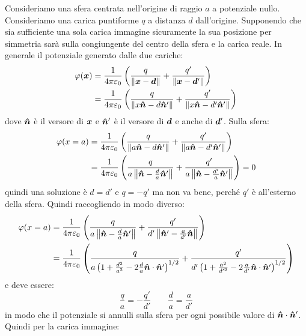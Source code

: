 \begin{Es}
  Consideriamo una sfera centrata nell'origine di raggio $a$ a potenziale nullo. Consideriamo una carica puntiforme $q$ a distanza $d$ dall'origine. Supponendo che sia sufficiente una sola carica immagine sicuramente la sua posizione per simmetria sarà sulla congiungente del centro della sfera e la carica reale. In generale il potenziale generato dalle due cariche:
  \begin{equation*}
    \begin{aligned}
      \varphi(\boldsymbol{x}) & = \frac{1}{4\pi\varepsilon_0}\left(\frac{q}{\left\lVert\boldsymbol{x} -\boldsymbol{d}\right\rVert}+\frac{q'}{\left\lVert\boldsymbol{x}-\boldsymbol{d}'\right\rVert}\right)           \\
                     & = \frac{1}{4\pi\varepsilon_0}\left(\frac{q}{\left\lVert x\boldsymbol{\hat {n}} -d\boldsymbol{\hat {n}}'\right\rVert}+\frac{q'}{\left\lVert x\boldsymbol{\hat {n}}-d'\boldsymbol{\hat {n}}'\right\rVert}\right)
    \end{aligned}
  \end{equation*}
  dove $\boldsymbol{\hat {n}}$ è il versore di $\boldsymbol{x}$ e $\boldsymbol{\hat {n}}'$ è il versore di $\boldsymbol{d}$ e anche di $\boldsymbol{d}'$. Sulla sfera:
  \begin{equation*}
    \begin{aligned}
      \varphi(x=a) & = \frac{1}{4\pi\varepsilon_0}\left(\frac{q}{\left\lVert a\boldsymbol{\hat {n}} -d\boldsymbol{\hat {n}}'\right\rVert}+\frac{q'}{\left\lVert a\boldsymbol{\hat {n}}-d'\boldsymbol{\hat {n}}'\right\rVert}\right)                       \\
                   & = \frac{1}{4\pi\varepsilon_0}\left(\frac{q}{a\left\lVert\boldsymbol{\hat {n}} -\frac{d}{a}\boldsymbol{\hat {n}}'\right\rVert}+\frac{q'}{a\left\lVert\boldsymbol{\hat {n}}-\frac{d'}{a}\boldsymbol{\hat {n}}'\right\rVert}\right)=0
    \end{aligned}
  \end{equation*}
  quindi una soluzione è $d=d'$ e $q=-q'$ ma non va bene, perché $q'$ è all'esterno della sfera. Quindi raccogliendo in modo diverso:
  \begin{equation*}
    \begin{aligned}
      \varphi(x=a) & = \frac{1}{4\pi\varepsilon_0}\left(\frac{q}{a\left\lVert\boldsymbol{\hat {n}}-\frac{d}{a}\boldsymbol{\hat {n}}'\right\rVert}+\frac{q'}{d'\left\lVert\boldsymbol{\hat {n}}'-\frac{a}{d'}\boldsymbol{\hat {n}}\right\rVert}\right)                                                                        \\
                   & = \frac{1}{4\pi\varepsilon_0}\left(\frac{q}{a\left(1+\frac{d^2}{a^2}-2\frac{d}{a}\boldsymbol{\hat {n}}\cdot\boldsymbol{\hat {n}}'\right)^{1/2}}+\frac{q'}{d'\left(1+\frac{a^2}{d'^2}-2\frac{a}{d'}\boldsymbol{\hat {n}}\cdot\boldsymbol{\hat {n}}'\right)^{1/2}}\right)
    \end{aligned}
  \end{equation*}
  e deve essere:
  \[
    \frac{q}{a}=-\frac{q'}{d'}\qquad \frac{d}{a}=\frac{a}{d'}
  \]
  in modo che il potenziale si annulli sulla sfera per ogni possibile valore di $\boldsymbol{\hat {n}}\cdot\boldsymbol{\hat {n}}'$.  Quindi per la carica immagine:

\end{Es}
